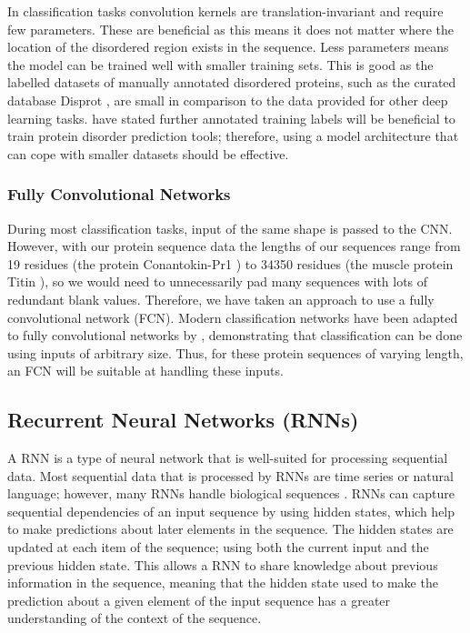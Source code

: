 \documentclass{l4proj}
\begin{document}
In classification tasks convolution kernels are translation-invariant and require few parameters. These are beneficial as this means it does not matter where the location of the disordered region exists in the sequence. Less parameters means the model can be trained well with smaller training sets. This is good as the labelled datasets of manually annotated disordered proteins, such as the curated database Disprot \citep{disprot}, are small in comparison to the data provided for other deep learning tasks. \cite{disopred3_paper} have stated further annotated training labels will be beneficial to train protein disorder prediction tools; therefore, using a model architecture that can cope with smaller datasets should be effective. \\

\subsubsection{Fully Convolutional Networks \newline}
\label{chap:background sec:FCN}

During most classification tasks, input of the same shape is passed to the CNN. However, with our protein sequence data the lengths of our sequences range from 19 residues (the protein Conantokin-Pr1 \citep{uniprot:22}) to 34350 residues (the muscle protein Titin \citep{uniprot:22}), so we would need to unnecessarily pad many sequences with lots of redundant blank values. Therefore, we have taken an approach to use a fully convolutional network (FCN). Modern classification networks have been adapted to fully convolutional networks by \cite{fcn_seg}, demonstrating that classification can be done using inputs of arbitrary size. Thus, for these protein sequences of varying length, an FCN will be suitable at handling these inputs. 

\subsection{Recurrent Neural Networks (RNNs)}
\label{chap:background sec:RNN}

A RNN is a type of neural network that is well-suited for processing sequential data. Most sequential data that is processed by RNNs are time series or natural language; however, many RNNs handle biological sequences \citep{Hawkins:05}. RNNs can capture sequential dependencies of an input sequence by using hidden states, which help to make predictions about later elements in the sequence. The hidden states are updated at each item of the sequence; using both the current input and the previous hidden state. This allows a RNN to share knowledge about previous information in the sequence, meaning that the hidden state used to make the prediction about a given element of the input sequence has a greater understanding of the context of the sequence.
\end{document}
